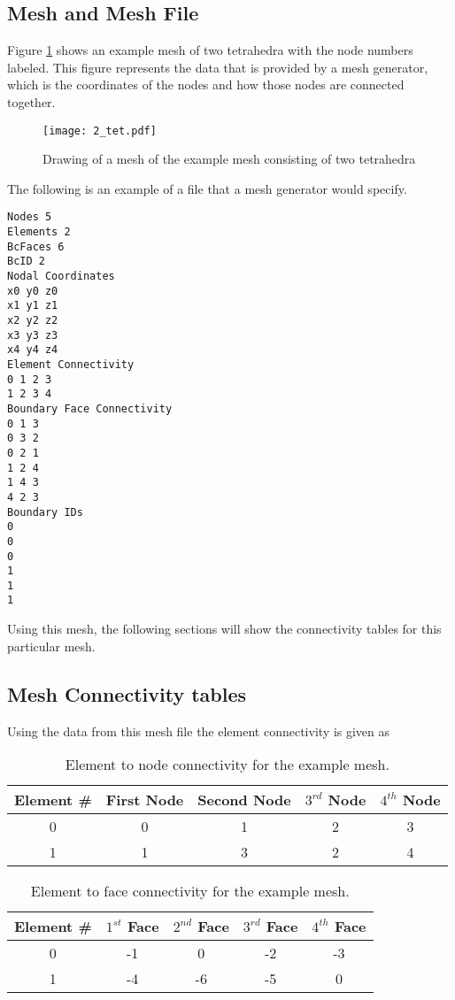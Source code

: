 \documentclass[letterpaper]{article}
\newcommand{\figref}[1]{Figure \ref{#1}}                %
\newcommand{\lfigwidth}{.68\textwidth} %
\begin{document}
\subsection{Mesh and Mesh File}
\figref{fig:two_tet_drawing} shows an example mesh of two tetrahedra with the node numbers labeled.  This figure represents the data that is provided by a mesh generator, which is the coordinates of the nodes and how those nodes are connected together.  
\begin{figure}[h!]
\centering
\texttt{[image: 2\_tet.pdf]}
\caption{Drawing of a mesh of the example mesh consisting of two tetrahedra}
\label{fig:two_tet_drawing}
\end{figure}
The following is an example of a file that a mesh generator would specify. 
\begin{lstlisting}[style=Meshfile]
Nodes 5
Elements 2
BcFaces 6
BcID 2
Nodal Coordinates
x0 y0 z0 
x1 y1 z1 
x2 y2 z2 
x3 y3 z3
x4 y4 z4 
Element Connectivity
0 1 2 3 
1 2 3 4
Boundary Face Connectivity
0 1 3
0 3 2
0 2 1
1 2 4 
1 4 3
4 2 3
Boundary IDs
0 
0 
0 
1 
1
1
\end{lstlisting}
 Using this mesh, the following sections will show the connectivity tables for this particular mesh. 
 \subsection{Mesh Connectivity tables}
Using the data from this mesh file the element connectivity is given as 
\begin{table}[h!]
\centering 
\begin{tabular}{|c|cccc|}
\hline
Element \# &First Node & Second Node & $3^{rd}$ Node & $4^{th}$ Node\\
\hline
0 & 0 & 1 & 2 & 3 \\
1 & 1 & 3 & 2 & 4 \\
\hline 
\end{tabular}
\caption{Element to node connectivity for the example mesh.}
\end{table}

\begin{table}[h!]
\centering 
\begin{tabular}{|c|cccc|}
\hline
Element \# & $1^{st}$ Face & $2^{nd}$ Face & $3^{rd}$ Face & $4^{th}$ Face \\
\hline
0 & -1  & 0 & -2 & -3 \\
1 & -4 & -6 & -5 & 0 \\
\hline 
\end{tabular}
\caption{Element to face connectivity for the example mesh.}
\end{table}
\end{document}
